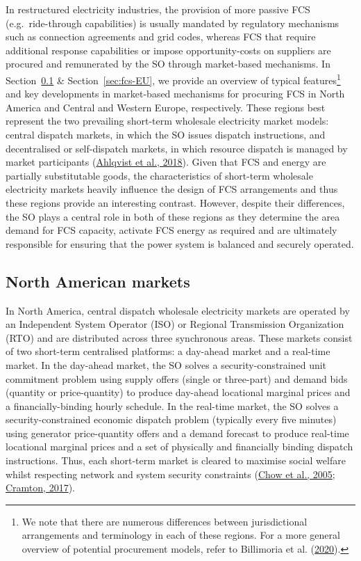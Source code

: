 \documentclass[12pt,a4paper,]{report}
\begin{document}
In restructured electricity industries, the provision of more passive
FCS (e.g.~ride-through capabilities) is usually mandated by regulatory
mechanisms such as connection agreements and grid codes, whereas FCS
that require additional response capabilities or impose
opportunity-costs on suppliers are procured and remunerated by the SO
through market-based mechanisms. In Section~\ref{sec:fcs-NA} \&
Section~\ref{sec:fcs-EU}, we provide an overview of typical
features\footnote{We note that there are numerous differences between
  jurisdictional arrangements and terminology in each of these regions.
  For a more general overview of potential procurement models, refer to
  Billimoria et al.
  (\protect\hyperlink{ref-billimoriaMarketDesignSystem2020}{2020}).} and
key developments in market-based mechanisms for procuring FCS in North
America and Central and Western Europe, respectively. These regions best
represent the two prevailing short-term wholesale electricity market
models: central dispatch markets, in which the SO issues dispatch
instructions, and decentralised or self-dispatch markets, in which
resource dispatch is managed by market participants
(\protect\hyperlink{ref-ahlqvistCentralSelfDispatchElectricity2018}{Ahlqvist
et al., 2018}). Given that FCS and energy are partially substitutable
goods, the characteristics of short-term wholesale electricity markets
heavily influence the design of FCS arrangements and thus these regions
provide an interesting contrast. However, despite their differences, the
SO plays a central role in both of these regions as they determine the
area demand for FCS capacity, activate FCS energy as required and are
ultimately responsible for ensuring that the power system is balanced
and securely operated.

\hypertarget{sec:fcs-NA}{%
\subsection{North American markets}\label{sec:fcs-NA}}

In North America, central dispatch wholesale electricity markets are
operated by an Independent System Operator (ISO) or Regional
Transmission Organization (RTO) and are distributed across three
synchronous areas. These markets consist of two short-term centralised
platforms: a day-ahead market and a real-time market. In the day-ahead
market, the SO solves a security-constrained unit commitment problem
using supply offers (single or three-part) and demand bids (quantity or
price-quantity) to produce day-ahead locational marginal prices and a
financially-binding hourly schedule. In the real-time market, the SO
solves a security-constrained economic dispatch problem (typically every
five minutes) using generator price-quantity offers and a demand
forecast to produce real-time locational marginal prices and a set of
physically and financially binding dispatch instructions. Thus, each
short-term market is cleared to maximise social welfare whilst
respecting network and system security constraints
(\protect\hyperlink{ref-chowElectricityMarketDesign2005}{Chow et al.,
2005};
\protect\hyperlink{ref-cramtonElectricityMarketDesign2017}{Cramton,
2017}).
\end{document}
